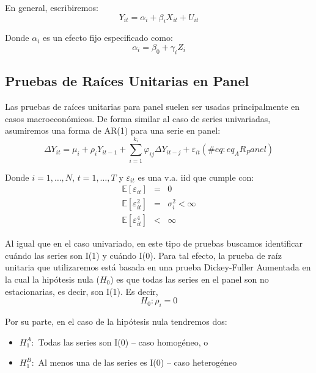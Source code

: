 \documentclass[
]{book}
\begin{document}
En general, escribiremos:
\begin{equation}
    Y_{it} = \alpha_i + \beta_i X_{it} + U_{it}
\end{equation}

Donde \(\alpha_i\) es un efecto fijo especificado como:
\begin{equation}
    \alpha_i = \beta_0 + \gamma_i Z_i
\end{equation}

\hypertarget{pruebas-de-rauxedces-unitarias-en-panel}{%
\subsection{Pruebas de Raíces Unitarias en Panel}\label{pruebas-de-rauxedces-unitarias-en-panel}}

Las pruebas de raíces unitarias para panel suelen ser usadas principalmente en casos macroeconómicos. De forma similar al caso de series univariadas, asumiremos una forma de AR(1) para una serie en panel:
\begin{equation}
    \Delta Y_{it} = \mu_i + \rho_i Y_{i t-1} + \sum_{i = 1}^{k_i} \varphi_{ij} \Delta Y_{i t-j} + \varepsilon_{it}
    (\#eq:eq_AR_Panel)
\end{equation}

Donde \(i = 1, \ldots, N\), \(t = 1, \ldots, T\) y \(\varepsilon_{it}\) es una v.a. iid que cumple con:
\begin{eqnarray*}
    \mathbb{E}[\varepsilon_{it}] & = & 0 \\
    \mathbb{E}[\varepsilon_{it}^2] & = & \sigma^2_i < \infty \\
    \mathbb{E}[\varepsilon_{it}^4] & < & \infty 
\end{eqnarray*}

Al igual que en el caso univariado, en este tipo de pruebas buscamos identificar cuándo las series son I(1) y cuándo I(0). Para tal efecto, la prueba de raíz unitaria que utilizaremos está basada en una prueba Dickey-Fuller Aumentada en la cual la hipótesis nula (\(H_0\)) es que todas las series en el panel son no estacionarias, es decir, son I(1). Es decir,
\begin{equation}
    H_0 : \rho_i = 0
\end{equation}

Por su parte, en el caso de la hipótesis nula tendremos dos:

\begin{itemize}
    \item $H_1^A :$ Todas las series son I(0) -- caso homogéneo, o
    
    \item $H_1^B :$ Al menos una de las series es I(0) -- caso heterogéneo
\end{itemize}
\end{document}
